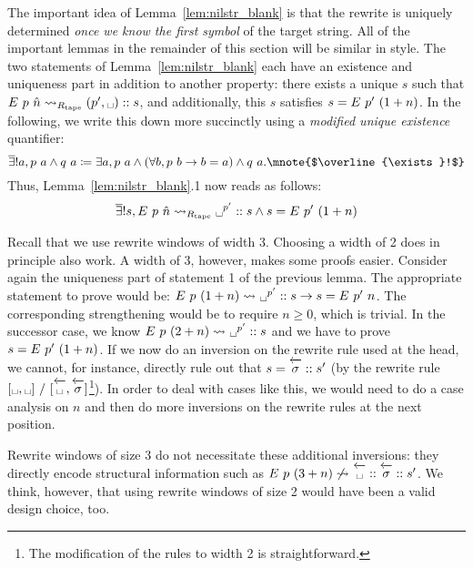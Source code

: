 The important idea of Lemma~\ref{lem:nilstr_blank} is that the rewrite is uniquely determined \emph{once we know the first symbol} of the target string. All of the important lemmas in the remainder of this section will be similar in style.
\newcommand{\mexists}{\overline{\exists}!}
The two statements of Lemma~\ref{lem:nilstr_blank} each have an existence and uniqueness part in addition to another property: there exists a unique $s$ such that $\nilstr{p}{\hat{n}} \strent{\Rtape} (p', \blank) :: s$, and additionally, this $s$ satisfies $s = E~p'~(1 +{n})$. In the following, we write this down more succinctly using a \emph{modified unique existence} quantifier:
\[\mexists a, p~a \land q~a \defeq \exists a, p~a \land (\forall b, p~b \rightarrow b = a) \land q~a. \mnote{$\mexists$}\]
Thus, Lemma~\ref{lem:nilstr_blank}.1 now reads as follows: 
\[\mexists s, \nilstr{p}{\hat{n}} \strent{\Rtape} \blank^{p'} :: s \land s = \nilstr{p'}{(\natS{n})}\]

\begin{remark}
  Recall that we use rewrite windows of width 3. Choosing a width of 2 does in principle also work. 
  A width of 3, however, makes some proofs easier. Consider again the uniqueness part of statement 1 of the previous lemma. 
  The appropriate statement to prove would be: $\nilstr{p}{(\natS{n})} \strent{} \blank^{p'} :: s \rightarrow s = \nilstr{p'}{n}$. The corresponding strengthening would be to require $n \ge 0$, which is trivial. 
  In the successor case, we know $\nilstr{p}{(2 + n)} \strent{} \blank^{p'} :: s$ and we have to prove $s = E~p'~(1 + n)$. If we now do an inversion on the rewrite rule used at the head, we cannot, for instance, directly rule out that $s = \polneg{\sigma} :: s'$ (by the rewrite rule $[\blank, \blank]~/~[\polneg{\blank}, \polneg{\sigma}]$\footnote{The modification of the rules to width 2 is straightforward.}). In order to deal with cases like this, we would need to do a case analysis on $n$ and then do more inversions on the rewrite rules at the next position. 

  Rewrite windows of size 3 do not necessitate these additional inversions: they directly encode structural information such as $\nilstr{p}{(3+n)} \not\strent{} \polneg{\blank} :: \polneg{\sigma} :: s'$. 
  We think, however, that using rewrite windows of size 2 would have been a valid design choice, too.
\end{remark}

